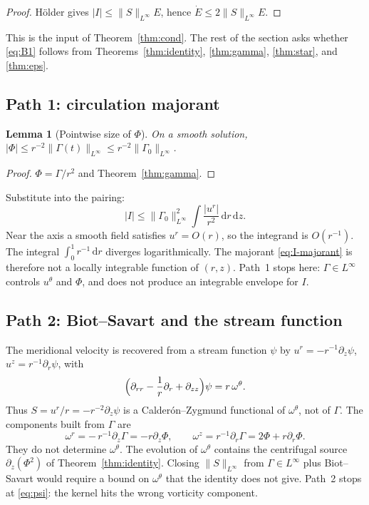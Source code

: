 \documentclass[11pt]{article}
\newtheorem{lemma}[theorem]{Lemma}
\theoremstyle{definition}
\newcommand{\dd}{\mathrm{d}}
\newcommand{\ur}{u^{r}}
\newcommand{\uz}{u^{z}}
\newcommand{\ut}{u^{\theta}}
\newcommand{\Ph}{\Phi}
\newcommand{\Ga}{\Gamma}
\newcommand{\Lint}{L^{\infty}}
\newcommand{\norm}[2]{\|#1\|_{#2}}
\newcommand{\abs}[1]{\lvert#1\rvert}
\begin{document}
\begin{proof}
H\"older gives \(\abs{I}\le\norm{S}{\Lint}E\), hence
\(\dot E\le 2\norm{S}{\Lint}E\).
\end{proof}

This is the input of Theorem~\ref{thm:cond}. The rest of the section
asks whether \eqref{eq:B1} follows from Theorems~\ref{thm:identity},
\ref{thm:gamma}, \ref{thm:star}, and \ref{thm:eps}.

\subsection{Path 1: circulation majorant}

\begin{lemma}[Pointwise size of \(\Ph\)]
\label{lem:Phi-pt}
On a smooth solution,
\(\abs{\Ph}\le r^{-2}\norm{\Ga(t)}{\Lint}\le r^{-2}\norm{\Ga_0}{\Lint}\).
\end{lemma}

\begin{proof}
\(\Ph=\Ga/r^2\) and Theorem~\ref{thm:gamma}.
\end{proof}

Substitute into the pairing:
\begin{equation}
  \label{eq:I-majorant}
  \abs{I}
  \le\norm{\Ga_0}{\Lint}^2
  \int\frac{\abs{\ur}}{r^2}\,\dd r\,\dd z.
\end{equation}
Near the axis a smooth field satisfies \(\ur=O(r)\), so the integrand
is \(O(r^{-1})\). The integral
\(\int_0^1 r^{-1}\,\dd r\) diverges logarithmically.
The majorant \eqref{eq:I-majorant} is therefore not a locally integrable
function of \((r,z)\). Path~1 stops here: \(\Ga\in\Lint\) controls
\(\ut\) and \(\Ph\), and does not produce an integrable envelope for
\(I\).

\subsection{Path 2: Biot--Savart and the stream function}

The meridional velocity is recovered from a stream function \(\psi\)
by
\(\ur=-r^{-1}\partial_z\psi\), \(\uz=r^{-1}\partial_r\psi\),
with
\begin{equation}
  \label{eq:psi}
  \Bigl(\partial_{rr}-\frac1r\partial_r+\partial_{zz}\Bigr)\psi
  =r\,\omega^\theta.
\end{equation}
Thus \(S=\ur/r=-r^{-2}\partial_z\psi\) is a Calder\'on--Zygmund
functional of \(\omega^\theta\), not of \(\Ga\).
The components built from \(\Ga\) are
\begin{equation}
  \label{eq:omega-rz}
  \omega^r=-\,r^{-1}\partial_z\Ga=-r\partial_z\Ph,
  \qquad
  \omega^z=r^{-1}\partial_r\Ga=2\Ph+r\partial_r\Ph.
\end{equation}
They do not determine \(\omega^\theta\). The evolution of \(\omega^\theta\)
contains the centrifugal source \(\partial_z(\Ph^2)\) of
Theorem~\ref{thm:identity}. Closing \(\norm{S}{\Lint}\) from
\(\Ga\in\Lint\) plus Biot--Savart would require a bound on
\(\omega^\theta\) that the identity does not give.
Path~2 stops at \eqref{eq:psi}: the kernel hits the wrong vorticity
component.
\end{document}
